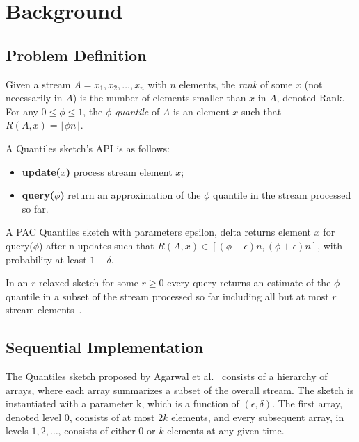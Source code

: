 \chapter{Background}
\label{chap:background}


\section{Problem Definition} \label{sec:problem_define}

Given a stream $A=x_1,x_2,\dots,x_n$ with $n$ elements,
the \emph{rank} of some $x$ (not necessarily in $A$) is the number of elements smaller than $x$ in $A$, denoted \gls{Rank}. For any $0 \leq \phi \leq 1$, the \emph{$\phi$ quantile} of $A$ is an element $x$ such that $R(A,x)=\lfloor \phi n \rfloor$.

A Quantiles sketch's \gls{API} is as follows:
\begin{itemize}
\item \textbf{update(}$x$\textbf{)} process stream element $x$;
\item \textbf{query(}$\phi$\textbf{)} return an approximation of the $\phi$ quantile in the stream processed so far. 
\end{itemize}
A PAC Quantiles sketch with parameters \gls{epsilon}, \gls{delta} returns element $x$ for query($\phi$) after n updates such that $R(A,x) \in \left[ (\phi-\epsilon)n,(\phi+\epsilon)n  \right]$, with probability at least $1-\delta$.

In an $r$-relaxed sketch for some $r\geq0$ every query returns an estimate of the $\phi$ quantile in a subset of the stream processed so far including all but at most $r$ stream elements~\cite{Henzinger_2013_Quantitative_Relaxation, Rinberg_2020_fast_sketches}.


\section{Sequential Implementation} \label{sec:seq_imp}


The Quantiles sketch proposed by Agarwal et al.~\cite{mergeables_summaries} consists of a hierarchy of arrays, where each array summarizes a subset of the overall stream. The sketch is instantiated with a parameter \gls{k}, which is a function of $(\epsilon,\delta)$. The first array, denoted level $0$, consists of at most $2k$ elements, and every subsequent array, in levels $1,2,\dots$, consists of either $0$ or $k$ elements at any given time.

